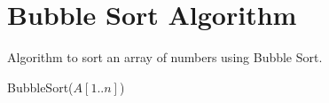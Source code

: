 \documentclass[10pt,a4paper]{article}
\begin{document}
\section*{Bubble Sort Algorithm}

Algorithm to sort an array of numbers using Bubble Sort.

\vspace{1cm}
\begin{algorithm}[H]
\caption{BubbleSort($A[1..n]$)}
\SetAlgoLined
\DontPrintSemicolon
{}
\;
\end{algorithm}
\end{document}
